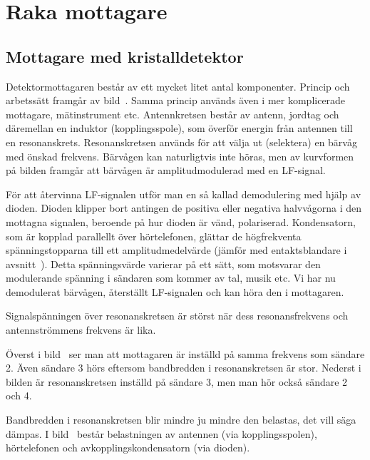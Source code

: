 \section{Raka mottagare}

\subsection{Mottagare med kristalldetektor}


Detektormottagaren består av ett mycket litet antal komponenter.
Princip och arbetssätt framgår av bild~.
Samma princip används även i mer komplicerade mottagare, mätinstrument etc.
Antennkretsen består av antenn, jordtag och däremellan en induktor
(kopplingsspole), som överför energin från antennen till en resonanskrets.
Resonanskretsen används för att välja ut (selektera) en bärvåg med önskad
frekvens.
Bärvågen kan naturligtvis inte höras, men av kurvformen på bilden framgår
att bärvågen är amplitudmodulerad med en LF-signal.

För att återvinna LF-signalen utför man en så kallad demodulering med hjälp
av dioden.
Dioden klipper bort antingen de positiva eller negativa halvvågorna i den
mottagna signalen, beroende på hur dioden är vänd, polariserad.
Kondensatorn, som är kopplad parallellt över hörtelefonen, glättar de
högfrekventa spänningstopparna till ett amplitudmedelvärde (jämför med
entaktsblandare i avsnitt~).
Detta spänningsvärde varierar på ett sätt, som motsvarar den modulerande
spänning i sändaren som kommer av tal, musik etc.
Vi har nu demodulerat bärvågen, återställt LF-signalen och kan höra den i
mottagaren.

Signalspänningen över resonanskretsen är störst när dess resonansfrekvens och
antennströmmens frekvens är lika.


Överst i bild~ ser man att mottagaren är inställd på
samma frekvens som sändare 2.
Även sändare 3 hörs eftersom bandbredden i resonanskretsen är stor.
Nederst i bilden är resonanskretsen inställd på sändare 3, men man hör
också sändare 2 och 4.

Bandbredden i resonanskretsen blir mindre ju mindre den belastas,
det vill säga dämpas.
I bild~ består belastningen av antennen (via
kopplingsspolen), hörtelefonen och avkopplingskondensatorn (via dioden).

